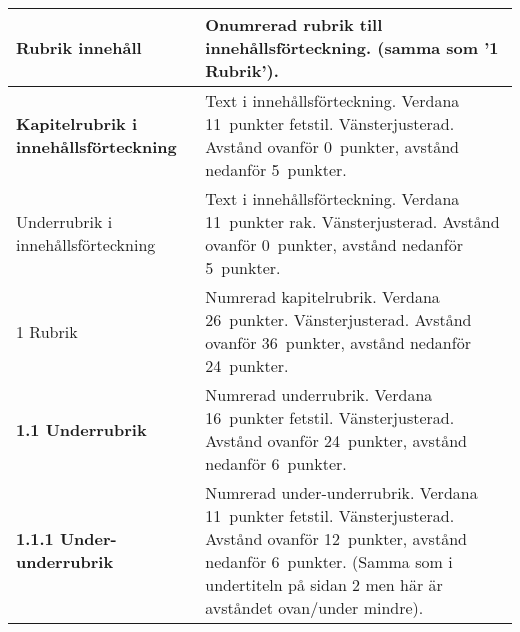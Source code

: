 \begin{longtable}{p{} p{}}
  \toprule
  {\sffamily\raggedright\Large{}Rubrik innehåll} &
  Onumrerad rubrik till innehållsförteckning.
  (samma som '1 Rubrik').
  \\
  \midrule
  {\sffamily\textbf{Kapitelrubrik i innehållsförteckning}} &
  Text i innehållsförteckning. Verdana 11~punkter fetstil. Vänsterjusterad.
  Avstånd ovanför 0~punkter, avstånd nedanför 5~punkter.
  \\
  \midrule
  {\sffamily{}Underrubrik i innehållsförteckning} &
  Text i innehållsförteckning. Verdana 11~punkter rak. Vänsterjusterad.
  Avstånd ovanför 0~punkter, avstånd nedanför 5~punkter.
  \\
  \midrule
  {\sffamily\Huge{}1 Rubrik} &
  Numrerad kapitelrubrik. Verdana 26~punkter. Vänsterjusterad.
  Avstånd ovanför 36~punkter, avstånd nedanför 24~punkter.
  \\
  \midrule
  {\sffamily\raggedright\bfseries\large{}1.1 Underrubrik} &
  Numrerad underrubrik. Verdana 16~punkter fetstil. Vänsterjusterad.
  Avstånd ovanför 24~punkter, avstånd nedanför 6~punkter.
  \\
  \midrule
  {\sffamily\raggedright\bfseries\normalsize{}1.1.1 Under-underrubrik} &
  Numrerad under-underrubrik. Verdana 11~punkter fetstil. Vänsterjusterad.
  Avstånd ovanför 12~punkter, avstånd nedanför 6~punkter. (Samma som i
  undertiteln på sidan 2 men här är avståndet ovan/under mindre).
  \\
  \bottomrule
\end{longtable}


